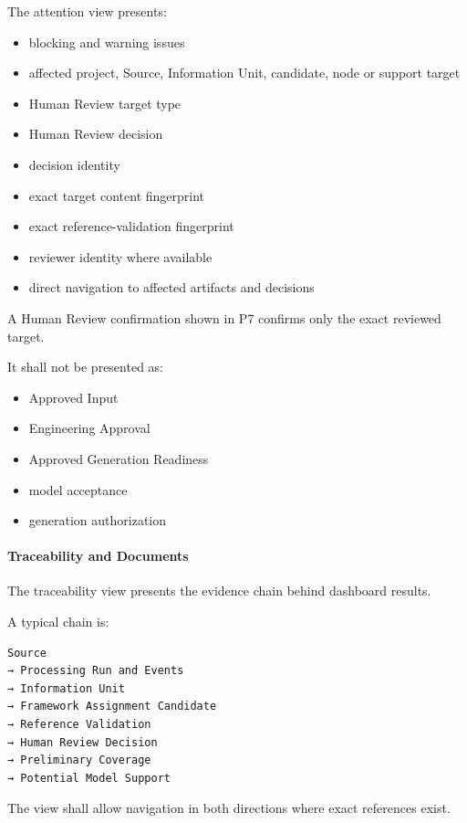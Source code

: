 The attention view presents:

\begin{itemize}
\tightlist
\item
  blocking and warning issues
\item
  affected project, Source, Information Unit, candidate, node or support target
\item
  Human Review target type
\item
  Human Review decision
\item
  decision identity
\item
  exact target content fingerprint
\item
  exact reference-validation fingerprint
\item
  reviewer identity where available
\item
  direct navigation to affected artifacts and decisions
\end{itemize}

A Human Review confirmation shown in P7 confirms only the exact reviewed target.

It shall not be presented as:

\begin{itemize}
\tightlist
\item
  Approved Input
\item
  Engineering Approval
\item
  Approved Generation Readiness
\item
  model acceptance
\item
  generation authorization
\end{itemize}

\hypertarget{traceability-and-documents}{%
\paragraph{Traceability and Documents}\label{traceability-and-documents}}

The traceability view presents the evidence chain behind dashboard results.

A typical chain is:

\begin{verbatim}
Source
→ Processing Run and Events
→ Information Unit
→ Framework Assignment Candidate
→ Reference Validation
→ Human Review Decision
→ Preliminary Coverage
→ Potential Model Support
\end{verbatim}

The view shall allow navigation in both directions where exact references exist.

